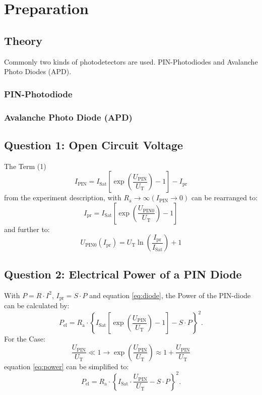 \chapter{Preparation}

\section{Theory}
Commonly two kinds of photodetectors are used. PIN-Photodiodes and Avalanche Photo Diodes (APD).
\subsection{PIN-Photodiode}

\subsection{Avalanche Photo Diode (APD)}
\section{Question 1: Open Circuit Voltage}
The Term (1)
\begin{equation}
 I_{\mathrm{PIN}} = I_{\mathrm{Sat}}\left[\exp\left(\frac{U_{\mathrm{PIN}}}{U_{\mathrm{T}}}\right)-1\right] -I_{\mathrm{pr}}
\label{eq:diode}
\end{equation}
from the experiment description, with $R_{\mathrm{a}}\to\infty(I_{\mathrm{PIN}}\to0)$ can be rearranged to:
\begin{equation}
 I_{\mathrm{pr}} = I_{\mathrm{Sat}}\left[\exp\left(\frac{U_{\mathrm{PIN0}}}{U_{\mathrm{T}}}\right)-1\right]
\end{equation}
and further to:
\begin{equation}
 U_{\mathrm{PIN0}}(I_{\mathrm{pr}}) = U_{\mathrm{T}}\ln\left(\frac{I_{\mathrm{pr}}}{I_{\mathrm{Sat}}}\right)+1
\end{equation}

\section{Question 2: Electrical Power of a PIN Diode}

With $P = R\cdot I^2$, $I_{\mathrm{pr}} = S\cdot P$ and equation \eqref{eq:diode}, the Power of the PIN-diode can be calculated by:
\begin{equation}
 P_{\mathrm{el}} = R_{\mathrm{a}}\cdot\left\{ I_{\mathrm{Sat}}\left[\exp\left(\frac{U_{\mathrm{PIN}}}{U_{\mathrm{T}}}\right)-1\right] -S\cdot P\right\}^2.
\label{eq:power}
\end{equation}
For the Case:
\begin{equation}
 \frac{U_{\mathrm{PIN}}}{U_{\mathrm{T}}} \ll 1 \to \exp\left(\frac{U_{\mathrm{PIN}}}{U_{\mathrm{T}}}\right)\approx1+\frac{U_{\mathrm{PIN}}}{U_{\mathrm{T}}}
\end{equation}
equation \eqref{eq:power} can be simplified to:
\begin{equation}
  P_{\mathrm{el}} = R_{\mathrm{a}}\cdot\left\{ I_{\mathrm{Sat}}\cdot\frac{U_{\mathrm{PIN}}}{U_{\mathrm{T}}} -S\cdot P\right\}^2.
\end{equation}

